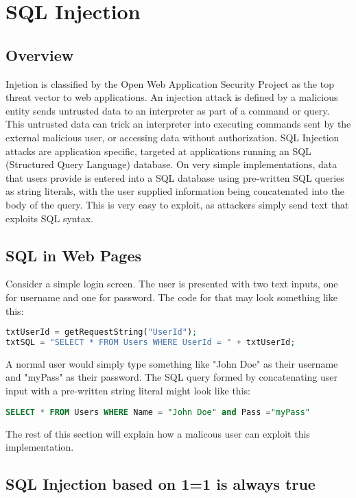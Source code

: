 \section{SQL Injection}

\subsection{Overview}
Injetion is classified by the Open Web Application Security Project as the top threat vector to web applications. An injection attack is defined by a malicious entity sends untrusted data to an interpreter as part of a command or query. This untrusted data can trick an interpreter into executing commands sent by the external malicious user, or accessing data without authorization. SQL Injection attacks are application specific, targeted at applications running an SQL (Structured Query Language) database. On very simple implementations, data that users provide is entered into a SQL database using pre-written SQL queries as string literals, with the user supplied information being concatenated into the body of the query. This is very easy to exploit, as attackers simply send text that exploits SQL syntax.

\subsection{SQL in Web Pages}

Consider a simple login screen. The user is presented with two text inputs, one for username and one for password. The code for that may look something like this:

\begin{lstlisting}[language = PHP]
txtUserId = getRequestString("UserId");
txtSQL = "SELECT * FROM Users WHERE UserId = " + txtUserId;
\end{lstlisting}

A normal user would simply type something like "John Doe" as their username and "myPass" as their password. The SQL query formed by concatenating user input with a pre-written string literal might look like this: 

\begin{lstlisting}[language = SQL]
SELECT * FROM Users WHERE Name = "John Doe" and Pass ="myPass"
\end{lstlisting} 

The rest of this section will explain how a malicous user can exploit this implementation.

\subsection{SQL Injection based on 1=1 is always true}

